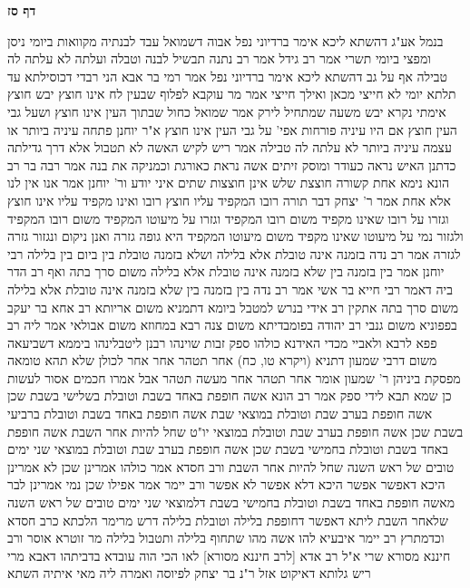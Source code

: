 \documentclass[12pt, openany]{book}
\newcommand{\sethebfont}{
\fontsize{10.5pt}{21.0pt} \selectfont
}
\newcommand{\twocol}[1]{
	{\sethebfont \begin{multicols}{2}
			#1
	\end{multicols}}	
}
\newcommand{\sectname}{}
\newcommand{\newsection}[1]{
	\addcontentsline{toc}{section}{#1}
	\renewcommand{\sectname}{#1}	
	\vspace{-\baselineskip}
	\begin{center}
		\textbf{%
\fontsize{16pt}{16pt}\selectfont
			#1}
	\end{center}
	\vspace{-\baselineskip}
	\nopagebreak
}
\begin{document}
\newsection{דף סז}
\twocol{בנמל אע"ג דהשתא ליכא אימר ברדיוני נפל 
אבוה דשמואל עבד לבנתיה מקוואות ביומי ניסן ומפצי ביומי תשרי 
אמר רב גידל אמר רב נתנה תבשיל לבנה וטבלה ועלתה לא עלתה לה טבילה אף על גב דהשתא ליכא אימר ברדיוני נפל 
אמר רמי בר אבא הני רבדי דכוסילתא עד תלתא יומי לא חייצי מכאן ואילך חייצי 
אמר מר עוקבא לפלוף שבעין לח אינו חוצץ יבש חוצץ אימתי נקרא יבש משעה שמתחיל לירק 
אמר שמואל כחול שבתוך העין אינו חוצץ ושעל גבי העין חוצץ אם היו עיניה פורחות אפי' על גבי העין אינו חוצץ 
א"ר יוחנן פתחה עיניה ביותר או עצמה עיניה ביותר לא עלתה לה טבילה 
אמר ריש לקיש האשה לא תטבול אלא דרך גדילתה כדתנן האיש נראה כעודר ומוסק זיתים אשה נראת כאורגת וכמניקה את בנה 
אמר רבה בר רב הונא נימא אחת קשורה חוצצת
שלש אינן חוצצות שתים איני יודע ור' יוחנן אמר אנו אין לנו אלא אחת 
אמר ר' יצחק דבר תורה רובו המקפיד עליו חוצץ רובו ואינו מקפיד עליו אינו חוצץ וגזרו על רובו שאינו מקפיד משום רובו המקפיד וגזרו על מיעוטו המקפיד משום רובו המקפיד 
ולגזור נמי על מיעוטו שאינו מקפיד משום מיעוטו המקפיד היא גופה גזרה ואנן ניקום ונגזור גזרה לגזרה 
אמר רב נדה בזמנה אינה טובלת אלא בלילה ושלא בזמנה טובלת בין ביום בין בלילה רבי יוחנן אמר בין בזמנה בין שלא בזמנה אינה טובלת אלא בלילה משום סרך בתה 
ואף רב הדר ביה דאמר רבי חייא בר אשי אמר רב נדה בין בזמנה בין שלא בזמנה אינה טובלת אלא בלילה משום סרך בתה
אתקין רב אידי בנרש למטבל ביומא דתמניא משום אריותא רב אחא בר יעקב בפפוניא משום גנבי
רב יהודה בפומבדיתא משום צנה רבא במחוזא משום אבולאי 
אמר ליה רב פפא לרבא ולאביי מכדי האידנא כולהו ספק זבות שוינהו רבנן ליטבלינהו ביממא דשביעאה 
משום דרבי שמעון דתניא (ויקרא טו, כח) אחר תטהר אחר אחר לכולן שלא תהא טומאה מפסקת ביניהן ר' שמעון אומר אחר תטהר אחר מעשה תטהר 
אבל אמרו חכמים אסור לעשות כן שמא תבא לידי ספק
אמר רב הונא אשה חופפת באחד בשבת וטובלת בשלישי בשבת שכן אשה חופפת בערב שבת וטובלת במוצאי שבת 
אשה חופפת באחד בשבת וטובלת ברביעי בשבת שכן אשה חופפת בערב שבת וטובלת במוצאי יו"ט שחל להיות אחר השבת 
אשה חופפת באחד בשבת וטובלת בחמישי בשבת שכן אשה חופפת בערב שבת וטובלת במוצאי שני ימים טובים של ראש השנה שחל להיות אחר השבת 
ורב חסדא אמר כולהו אמרינן שכן לא אמרינן היכא דאפשר אפשר היכא דלא אפשר לא אפשר 
ורב יימר אמר אפילו שכן נמי אמרינן לבר מאשה חופפת באחד בשבת וטובלת בחמישי בשבת דלמוצאי שני ימים טובים של ראש השנה שלאחר השבת ליתא דאפשר דחופפת בלילה וטובלת בלילה 
דרש מרימר הלכתא כרב חסדא וכדמתרץ רב יימר 
איבעיא להו אשה מהו שתחוף בלילה ותטבול בלילה מר זוטרא אוסר ורב חיננא מסורא שרי 
א"ל רב אדא [לרב חיננא מסורא] לאו הכי הוה עובדא בדביתהו דאבא מרי ריש גלותא דאיקוט אזל ר"נ בר יצחק לפיוסה ואמרה ליה מאי איתיה השתא}
\end{document}
